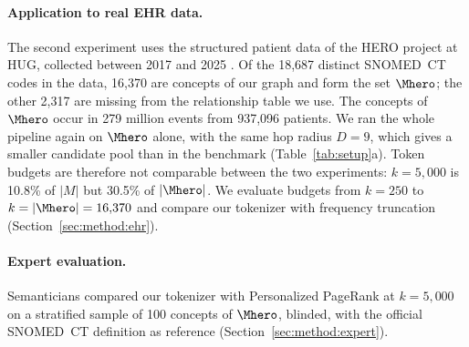 \paragraph{Application to real EHR data.}
The second experiment uses the structured patient data of the HERO project at HUG, collected between 2017 and 2025 .
Of the 18,687 distinct SNOMED~CT codes in the data, 16,370 are concepts of our graph and form the set $\Mhero$; the other 2,317 are missing from the relationship table we use.
The concepts of $\Mhero$ occur in 279 million events from 937,096 patients.
We ran the whole pipeline again on $\Mhero$ alone, with the same hop radius $D = 9$, which gives a smaller candidate pool than in the benchmark (Table~\ref{tab:setup}a).
Token budgets are therefore not comparable between the two experiments: $k = 5{,}000$ is 10.8\% of $|M|$ but 30.5\% of $|\Mhero|$.
We evaluate budgets from $k = 250$ to $k = |\Mhero| = 16{,}370$ and compare our tokenizer with frequency truncation (Section~\ref{sec:method:ehr}).

\paragraph{Expert evaluation.}
Semanticians compared our tokenizer with Personalized PageRank at $k = 5{,}000$ on a stratified sample of 100 concepts of $\Mhero$, blinded, with the official SNOMED~CT definition as reference (Section~\ref{sec:method:expert}).


